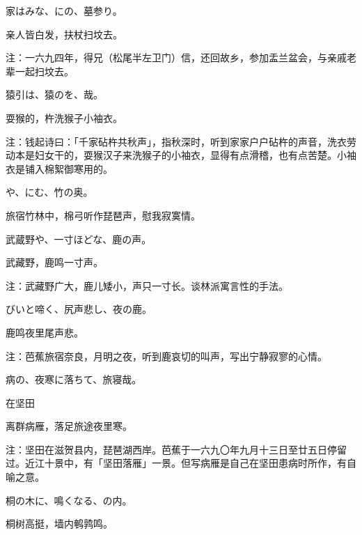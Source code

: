 \begin{haiku}
    {\FH 家はみな、にの、墓参り。}

    {\FK 亲人皆白发，扶杖扫坟去。}

    {\FT 注：一六九四年，得兄（松尾半左卫门）信，还回故乡，参加盂兰盆会，与亲戚老辈一起扫坟去。}
\end{haiku}

\begin{haiku}
    {\FH 猿引は、猿のを、哉。}

    {\FK 耍猴的，杵洗猴子小袖衣。}

    {\FT 注：钱起诗曰：「千家砧杵共秋声」，指秋深时，听到家家户户砧杵的声音，洗衣劳动本是妇女干的，耍猴汉子来洗猴子的小袖衣，显得有点滑稽，也有点苦楚。小袖衣是铺入棉絮御寒用的。}
\end{haiku}

\begin{haiku}
    {\FH {}や、にむ、竹の奥。}

    {\FK 旅宿竹林中，棉弓听作琵琶声，慰我寂寞情。}
\end{haiku}

\begin{haiku}
    {\FH 武蔵野や、一寸ほどな、鹿の声。}

    {\FK 武藏野，鹿鸣一寸声。}

    {\FT 注：武藏野广大，鹿儿矮小，声只一寸长。谈林派寓言性的手法。}
\end{haiku}

\begin{haiku}
    {\FH びいと啼く、尻声悲し、夜の鹿。}

    {\FK 鹿鸣夜里尾声悲。}

    {\FT 注：芭蕉旅宿奈良，月明之夜，听到鹿哀切的叫声，写出宁静寂寥的心情。}
\end{haiku}

\begin{haiku}
    {\FH 病の、夜寒に落ちて、旅寝哉。}

    {\FK 在坚田}

    {\FK 离群病雁，落足旅途夜里寒。}

    {\FT 注：坚田在滋贺县内，琵琶湖西岸。芭蕉于一六九〇年九月十三日至廿五日停留过。近江十景中，有「坚田落雁」一景。但写病雁是自己在坚田患病时所作，有自喻之意。}
\end{haiku}

\begin{haiku}
    {\FH 桐の木に、鳴くなる、の内。}

    {\FK 桐树高挺，墙内鹌鹑鸣。}
\end{haiku}

